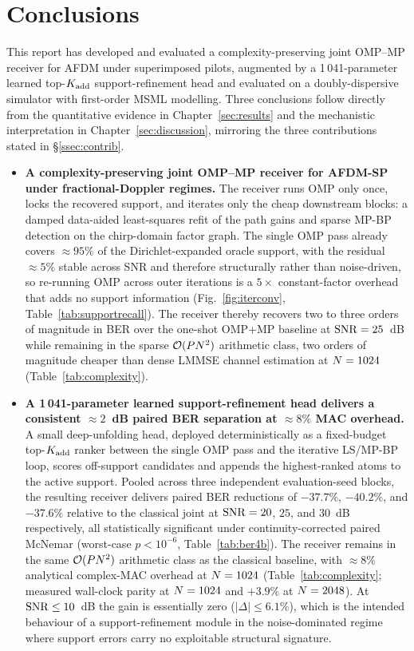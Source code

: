 \section{Conclusions}
\label{sec:conclusion}

This report has developed and evaluated a complexity-preserving joint OMP--MP receiver for AFDM under superimposed pilots, augmented by a 1\,041-parameter learned top-$K_{\mathrm{add}}$ support-refinement head and evaluated on a doubly-dispersive simulator with first-order MSML modelling. Three conclusions follow directly from the quantitative evidence in Chapter~\ref{sec:results} and the mechanistic interpretation in Chapter~\ref{sec:discussion}, mirroring the three contributions stated in \S\ref{ssec:contrib}.

\begin{itemize}[leftmargin=1.3em,itemsep=4pt,topsep=2pt]

\item \textbf{A complexity-preserving joint OMP--MP receiver for AFDM-SP under fractional-Doppler regimes.}
The receiver runs OMP only once, locks the recovered support, and iterates only the cheap downstream blocks: a damped data-aided least-squares refit of the path gains and sparse MP-BP detection on the chirp-domain factor graph. The single OMP pass already covers $\approx 95\%$ of the Dirichlet-expanded oracle support, with the residual $\approx 5\%$ stable across SNR and therefore structurally rather than noise-driven, so re-running OMP across outer iterations is a $5\times$ constant-factor overhead that adds no support information (Fig.~\ref{fig:iterconv}, Table~\ref{tab:supportrecall}). The receiver thereby recovers two to three orders of magnitude in BER over the one-shot OMP+MP baseline at $\mathrm{SNR} = 25$~dB while remaining in the sparse $\mathcal{O}(P N^2)$ arithmetic class, two orders of magnitude cheaper than dense LMMSE channel estimation at $N = 1024$ (Table~\ref{tab:complexity}).

\item \textbf{A 1\,041-parameter learned support-refinement head delivers a consistent $\approx 2$~dB paired BER separation at $\approx 8\%$ MAC overhead.}
A small deep-unfolding head, deployed deterministically as a fixed-budget top-$K_{\mathrm{add}}$ ranker between the single OMP pass and the iterative LS/MP-BP loop, scores off-support candidates and appends the highest-ranked atoms to the active support. Pooled across three independent evaluation-seed blocks, the resulting receiver delivers paired BER reductions of $-37.7\%$, $-40.2\%$, and $-37.6\%$ relative to the classical joint at $\mathrm{SNR} = 20$, $25$, and $30$~dB respectively, all statistically significant under continuity-corrected paired McNemar (worst-case $p < 10^{-6}$, Table~\ref{tab:ber4b}). The receiver remains in the same $\mathcal{O}(P N^2)$ arithmetic class as the classical baseline, with $\approx 8\%$ analytical complex-MAC overhead at $N = 1024$ (Table~\ref{tab:complexity}; measured wall-clock parity at $N = 1024$ and $+3.9\%$ at $N = 2048$). At $\mathrm{SNR} \leq 10$~dB the gain is essentially zero ($|\Delta| \leq 6.1\%$), which is the intended behaviour of a support-refinement module in the noise-dominated regime where support errors carry no exploitable structural signature.


\end{itemize}
